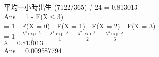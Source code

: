 \documentclass{article}
\begin{document}
\fontsize{15pt}{20pt}\selectfont

\begin{CJK}{UTF8}{bsmi} %
\noindent
平均一小時出生 (7122/365) / 24 = 0.813013\\
Ans = 1 - F(X$\leq$3)\\
	= 1 - F(X = 0) - F(X = 1) - F(X = 2) - F(X = 3)\\
	= 1 - $\frac{\lambda^{0}\exp^{-\lambda}}{1}$ - $\frac{\lambda^{1}\exp^{-\lambda}}{1}$ - $\frac{\lambda^{2}\exp^{-\lambda}}{2}$ - $\frac{\lambda^{3}\exp^{-\lambda}}{6}$\\
$\lambda = 0.813013$\\

Ans = 0.009587794\\
\end{CJK} %
\end{document}
